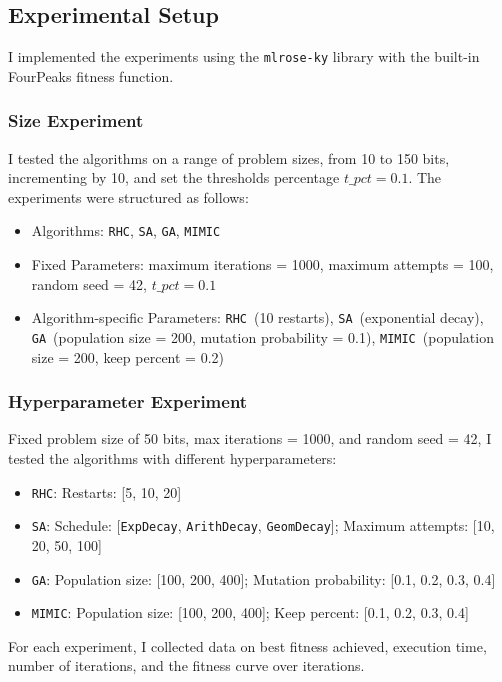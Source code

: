 \documentclass[conference]{IEEEtran}
\newcommand{\sa}{\texttt{SA}}
\newcommand{\ga}{\texttt{GA}}
\newcommand{\rhc}{\texttt{RHC}}
\newcommand{\mimic}{\texttt{MIMIC}}
\newcommand{\expD}{\texttt{ExpDecay}}
\newcommand{\arithD}{\texttt{ArithDecay}}
\newcommand{\geomD}{\texttt{GeomDecay}}
\begin{document}
\subsection{Experimental Setup}
I implemented the experiments using the \texttt{mlrose-ky} library with the built-in FourPeaks fitness function. 

\subsubsection{Size Experiment \label{sec:four-peaks-size-experiment}}
I tested the algorithms on a range of problem sizes, from 10 to 150 bits, incrementing by 10, and set the thresholds percentage $t\_pct = 0.1$. The experiments were structured as follows:
\begin{itemize}
    \item Algorithms: \rhc, \sa, \ga, \mimic
    \item Fixed Parameters: maximum iterations = 1000, maximum attempts = 100, random seed = 42, $t\_pct = 0.1$
    \item Algorithm-specific Parameters: \rhc\ (10 restarts), \sa\ (exponential decay), \ga\ (population size = 200, mutation probability = 0.1), \mimic\ (population size = 200, keep percent = 0.2)
\end{itemize}

\subsubsection{Hyperparameter Experiment \label{sec:four-peaks-hyperparameter-experiment}}
Fixed problem size of 50 bits, max iterations = 1000, and random seed = 42, I tested the algorithms with different hyperparameters:
\begin{itemize}
    \item \rhc: Restarts: [5, 10, 20]
    \item \sa: Schedule: [\expD, \arithD, \geomD]; Maximum attempts: [10, 20, 50, 100]
    \item \ga: Population size: [100, 200, 400]; Mutation probability: [0.1, 0.2, 0.3, 0.4]
    \item \mimic: Population size: [100, 200, 400]; Keep percent: [0.1, 0.2, 0.3, 0.4]
\end{itemize}
For each experiment, 
I collected data on best fitness achieved, execution time, number of iterations, and the fitness curve over iterations.
\end{document}

